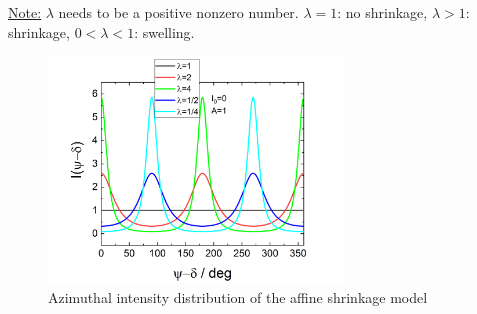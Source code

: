 \underline{Note:}
$\lambda$ needs to be a positive nonzero number. $\lambda=1$: no shrinkage, $\lambda>1$: shrinkage, $0<\lambda<1$: swelling.


\begin{figure}[htb]
\begin{center}
\includegraphics[width=0.7\textwidth]{../images/form_factor/azimuthal/affine_shrinkage.png}
\end{center}
\caption{Azimuthal intensity distribution of the affine shrinkage model}
\label{fig:affineshrinkage}
\end{figure}

